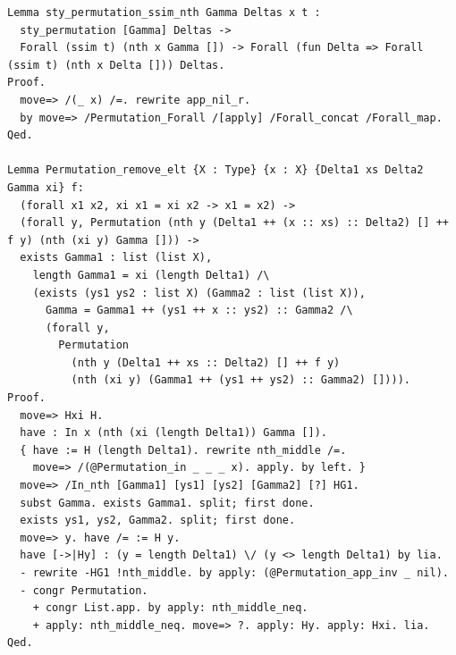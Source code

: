 \begin{lstlisting}[style=authorcoq]
Lemma sty_permutation_ssim_nth Gamma Deltas x t :
  sty_permutation [Gamma] Deltas ->
  Forall (ssim t) (nth x Gamma []) -> Forall (fun Delta => Forall (ssim t) (nth x Delta [])) Deltas.
Proof.
  move=> /(_ x) /=. rewrite app_nil_r.
  by move=> /Permutation_Forall /[apply] /Forall_concat /Forall_map.
Qed.

Lemma Permutation_remove_elt {X : Type} {x : X} {Delta1 xs Delta2 Gamma xi} f:
  (forall x1 x2, xi x1 = xi x2 -> x1 = x2) ->
  (forall y, Permutation (nth y (Delta1 ++ (x :: xs) :: Delta2) [] ++ f y) (nth (xi y) Gamma [])) ->
  exists Gamma1 : list (list X),
    length Gamma1 = xi (length Delta1) /\
    (exists (ys1 ys2 : list X) (Gamma2 : list (list X)),
      Gamma = Gamma1 ++ (ys1 ++ x :: ys2) :: Gamma2 /\
      (forall y,
        Permutation
          (nth y (Delta1 ++ xs :: Delta2) [] ++ f y)
          (nth (xi y) (Gamma1 ++ (ys1 ++ ys2) :: Gamma2) []))).
Proof.
  move=> Hxi H.
  have : In x (nth (xi (length Delta1)) Gamma []).
  { have := H (length Delta1). rewrite nth_middle /=.
    move=> /(@Permutation_in _ _ _ x). apply. by left. }
  move=> /In_nth [Gamma1] [ys1] [ys2] [Gamma2] [?] HG1.
  subst Gamma. exists Gamma1. split; first done.
  exists ys1, ys2, Gamma2. split; first done.
  move=> y. have /= := H y.
  have [->|Hy] : (y = length Delta1) \/ (y <> length Delta1) by lia.
  - rewrite -HG1 !nth_middle. by apply: (@Permutation_app_inv _ nil).
  - congr Permutation.
    + congr List.app. by apply: nth_middle_neq.
    + apply: nth_middle_neq. move=> ?. apply: Hy. apply: Hxi. lia.
Qed.


\end{lstlisting}
